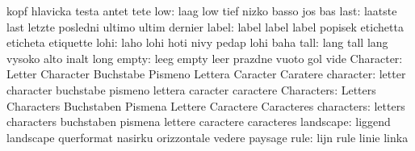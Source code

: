                            kopf                      hlavicka
                           testa                     antet
                           tete
                      low: laag                      low
                           tief                      nizko
                           basso                     jos
                           bas
                     last: laatste                   last
                           letzte                    posledni
                           ultimo                    ultim
                           dernier
                    label: label                     label
                           label                     popisek
                           etichetta                 eticheta
                           etiquette
                     lohi: laho                      lohi
                           hoti                      nivy
                           pedap                     lohi
                           baha
                     tall: lang                      tall
                           lang                      vysoko
                           alto                      inalt
                           long
                    empty: leeg                      empty
                           leer                      prazdne
                           vuoto                     gol
                           vide
                Character: Letter                    Character
                           Buchstabe                 Pismeno
                           Lettera                   Caracter
                           Caratere
                character: letter                    character
                           buchstabe                 pismeno
                           lettera                   caracter
                           caractere
               Characters: Letters                   Characters
                           Buchstaben                Pismena
                           Lettere                   Caractere
                           Caracteres
               characters: letters                   characters
                           buchstaben                pismena
                           lettere                   caractere
                           caracteres
                landscape: liggend                   landscape
                           querformat                nasirku
                           orizzontale               vedere
                           paysage
                     rule: lijn                      rule
                           linie                     linka
